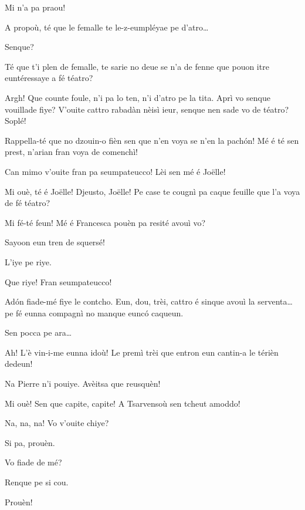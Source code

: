 \begin{drama}
\Joelspeaks Mi n'a pa praou!

\Pierrespeaks{} A propoù, té que le femalle te le-z-eumpléyae pe d'atro\ldots

\Vetchotspeaks  Senque?

\Pierrespeaks{} Té que t'i plen de femalle, te sarie no deue se n'a de fenne que pouon itre euntéressaye a fé téatro?

\Vetchotspeaks  Argh! Que counte foule, n'i pa lo ten, n'i d’atro pe la tita. Aprì vo senque vouillade fiye? V'ouite cattro rabadàn nèisì ieur, senque nen sade vo de téatro? Soplé!
 
\Joelspeaks  Rappella-té que no dzouin-o fièn sen que n'en voya se n'en la pach\'on!  Mé é té sen prest, n'arian fran voya de comenchì!

\Francescaspeaks Can mimo v'ouite fran pa seumpateucco! Lèi sen mé é Jo\"{e}lle! 

\Pierrespeaks  Mi ouè, té é Jo\"{e}lle! Djeusto, Jo\"{e}lle! Pe case te cougnì pa caque feuille que l'a voya de fé téatro?
 
\Joellespeaks {} Mi fé-té feun! Mé é Francesca pouèn pa resité avouì vo?
  
\Joelspeaks Sayoon eun tren de squersé!

\Pierrespeaks L'iye pe riye.

\Francescaspeaks{} Que riye!
\Joellespeaks{} Fran seumpateucco! 

\Pierrespeaks Ad\'on fiade-mé fiye le contcho.  Eun, dou, trèi, cattro é sinque avouì la serventa\ldots pe fé eunna compagnì no manque euncó caqueun.

\Joelspeaks Sen pocca pe ara\ldots

\Pierrespeaks  Ah! L'è vin-i-me eunna idoù! Le premì trèi que entron eun cantin-a le térièn dedeun!

\Joelspeaks Na Pierre n'i pouiye. Avèitsa que reusquèn!

\Pierrespeaks Mi ouè! Sen que capite, capite! A Tsarvensoù sen tcheut amoddo!

\Joelspeaks Na, na, na!  Vo v'ouite chiye?

\Joellespeaks Si pa, prouèn.

\Pierrespeaks{} Vo fiade de mé?

\Francescaspeaks Renque pe si cou.

\Joelspeaks Prouèn!


\end{drama}
